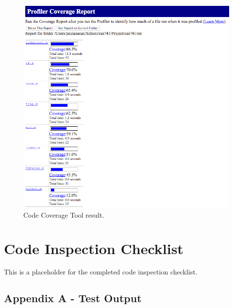 \documentclass[12pt, titlepage]{article}
\begin{document}
\begin{figure}[H]
 \includegraphics[width=\linewidth]{images/CCM}
  \caption{Code Coverage Tool result.}
  \label{fig:CCM}
\end{figure}

\newpage

\section{Code Inspection Checklist} \label{sec_cic}
This is a placeholder for the completed code inspection checklist.





\newpage
\begin{landscape}
\section{Appendix A - Test Output} \label{app_a}

\end{landscape}
\end{document}

